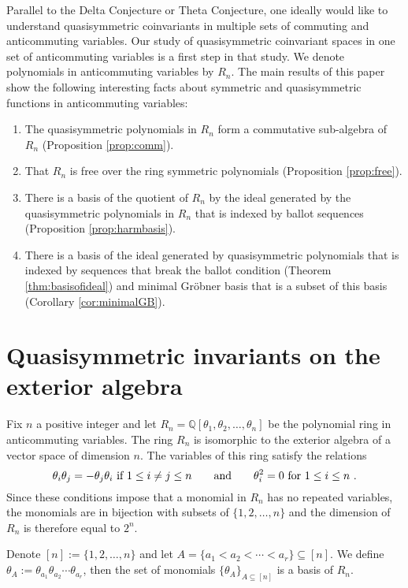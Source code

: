 \documentclass[11pt]{amsart}
\theoremstyle{definition}
\numberwithin{equation}{section}
\begin{document}
Parallel to the Delta Conjecture or Theta Conjecture, one ideally would like to understand quasisymmetric coinvariants in multiple sets of commuting and anticommuting variables.  Our study of quasisymmetric coinvariant spaces in one set of anticommuting variables is a first step in that study.  We denote polynomials in anticommuting variables by $R_n$. The main results of this paper show the following interesting facts about symmetric and quasisymmetric functions in anticommuting variables:
\begin{enumerate}
\item The quasisymmetric polynomials in $R_n$ form a commutative sub-algebra of $R_n$
(Proposition \ref{prop:comm}).
\item That $R_n$ is free over the ring symmetric polynomials (Proposition \ref{prop:free}).
\item There is a basis of the quotient of $R_n$ by the ideal generated by the
quasisymmetric polynomials in $R_n$ that is indexed by ballot sequences (Proposition \ref{prop:harmbasis}).
\item There is a basis of the ideal generated by quasisymmetric polynomials
that is indexed by sequences that break the ballot condition
(Theorem \ref{thm:basisofideal}) and minimal Gr\"obner basis
that is a subset of this basis (Corollary \ref{cor:minimalGB}).
\end{enumerate}
\section{Quasisymmetric invariants on the exterior algebra}

Fix $n$ a positive integer and
let $R_n = {\mathbb Q}[\theta_1, \theta_2, \ldots, \theta_n]$ be the
polynomial ring in anticommuting variables.
The ring $R_n$ is isomorphic to the exterior algebra of a vector
space of dimension $n$.  The variables of this ring satisfy the relations
\[
\theta_i \theta_j = - \theta_j \theta_i \hbox{ if } 1 \leq i \neq j \leq n
\qquad\hbox{and}\qquad \theta_i^2 = 0 \hbox{ for }1 \leq i \leq n~.
\]
Since these conditions impose that a monomial in $R_n$ has no repeated variables,
the monomials are in bijection with subsets of $\{1,2,\ldots, n\}$
and the dimension of $R_n$ is therefore equal to $2^n$.

Denote $[n] := \{1,2, \ldots,n\}$ and
let $A = \{a_1 < a_2 < \cdots < a_r \} \subseteq [n]$.
We define $\theta_A := \theta_{a_1} \theta_{a_2} \cdots \theta_{a_r}$,
then the set of monomials $\{ \theta_A \}_{A \subseteq [n]}$ is a basis of $R_n$.
\end{document}
